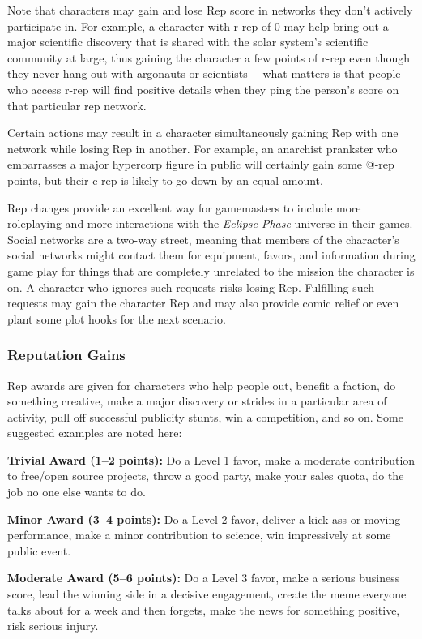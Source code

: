 Note that characters may gain and lose Rep score in networks they don't actively participate in. For example, a character with r-rep of 0 may help bring out a major scientific discovery that is shared with the solar system's scientific community at large, thus gaining the character a few points of r-rep even though they never hang out with argonauts or scientists— what matters is that people who access r-rep will find positive details when they ping the person's score on that particular rep network. 

Certain actions may result in a character simultaneously gaining Rep with one network while losing Rep in another. For example, an anarchist prankster who embarrasses a major hypercorp figure in public will certainly gain some @-rep points, but their c-rep is likely to go down by an equal amount. 

Rep changes provide an excellent way for gamemasters to include more roleplaying and more interactions with the \textit{Eclipse Phase} universe in their games. Social networks are a two-way street, meaning that members of the character's social networks might contact them for equipment, favors, and information during game play for things that are completely unrelated to the mission the character is on. A character who ignores such requests risks losing Rep. Fulfilling such requests may gain the character Rep and may also provide comic relief or even plant some plot hooks for the next scenario. 

\subsubsection{Reputation Gains} 

Rep awards are given for characters who help people out, benefit a faction, do something creative, make a major discovery or strides in a particular area of activity, pull off successful publicity stunts, win a competition, and so on. Some suggested examples are noted here: 

\textbf{Trivial Award (1–2 points):} Do a Level 1 favor, make a moderate contribution to free/open source projects, throw a good party, make your sales quota, do the job no one else wants to do. 

\textbf{Minor Award (3–4 points):} Do a Level 2 favor, deliver a kick-ass or moving performance, make a minor contribution to science, win impressively at some public event. 

\textbf{Moderate Award (5–6 points):} Do a Level 3 favor, make a serious business score, lead the winning side in a decisive engagement, create the meme everyone talks about for a week and then forgets, make the news for something positive, risk serious injury. 

